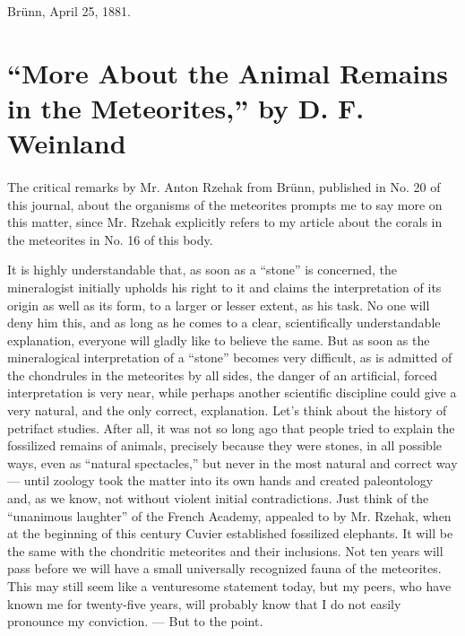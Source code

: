 \documentclass[a4paper, 12pt, oneside]{article}
\begin{document}
Brünn, April 25, 1881.
\clearpage
\section{``More About the Animal Remains in the Meteorites,'' by D. F. Weinland}
\paragraph*{}
The critical remarks by Mr. Anton Rzehak from Brünn, published in No. 20 of this journal, about the organisms of the meteorites prompts me to say more on this matter, since Mr. Rzehak explicitly refers to my article about the corals in the meteorites in No. 16 of this body.

It is highly understandable that, as soon as a ``stone'' is concerned, the mineralogist initially upholds his right to it and claims the interpretation of its origin as well as its form, to a larger or lesser extent, as his task. No one will deny him this, and as long as he comes to a clear, scientifically understandable explanation, everyone will gladly like to believe the same. But as soon as the mineralogical interpretation of a ``stone'' becomes very difficult, as is admitted of the chondrules in the meteorites by all sides, the danger of an artificial, forced interpretation is very near, while perhaps another scientific discipline could give a very natural, and the only correct, explanation. Let's think about the history of petrifact studies. After all, it was not so long ago that people tried to explain the fossilized remains of animals, precisely because they were stones, in all possible ways, even as ``natural spectacles,'' but never in the most natural and correct way --- until zoology took the matter into its own hands and created paleontology and, as we know, not without violent initial contradictions. Just think of the ``unanimous laughter'' of the French Academy, appealed to by Mr. Rzehak, when at the beginning of this century Cuvier established fossilized elephants. It will be the same with the chondritic meteorites and their inclusions. Not ten years will pass before we will have a small universally recognized fauna of the meteorites. This may still seem like a venturesome statement today, but my peers, who have known me for twenty-five years, will probably know that I do not easily pronounce my conviction. --- But to the point.
\end{document}
